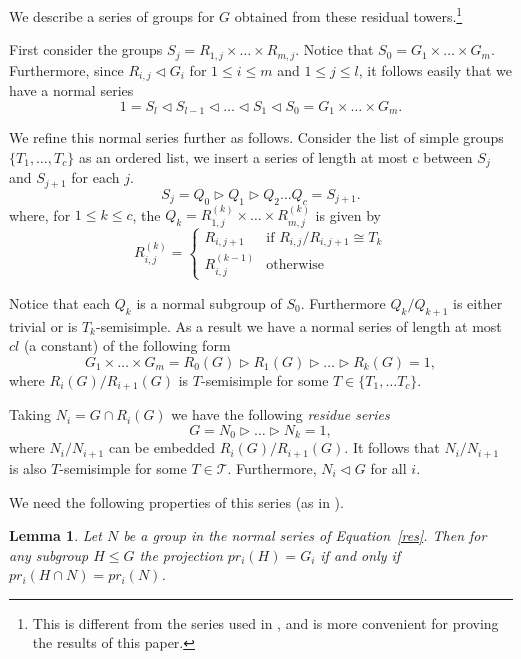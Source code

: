 \documentclass[11pt]{article}
\newtheorem{lemma}[theorem]{Lemma}
\newcommand{\pr}[2]{\ensuremath{pr_{#1}\left({#2}\right)}}
\begin{document}
We describe a series of groups for $G$ obtained from these residual
towers.\footnote{This is different from the series used in
\cite{luks}, and is more convenient for proving the results of this
paper.}

First consider the groups $S_j = R_{1,j} \times \ldots \times
R_{m,j}$.  Notice that $S_0 = G_1 \times \ldots \times G_m$.
Furthermore, since $R_{i,j} \lhd G_i$ for $1 \leq i \leq m$ and $1
\leq j \leq l$, it follows easily that we have a normal series
\[
1 = S_l \lhd S_{l-1} \lhd \ldots \lhd S_1 \lhd S_0 = G_1 \times \ldots
\times G_m.
\]

We refine this normal series further as follows. Consider the list of
simple groups $\{ T_1,\ldots, T_c\}$ as an ordered list, we insert a
series of length at most c between $S_j$ and $S_{j+1}$ for each $j$.
\[
S_j=Q_0 \rhd Q_1 \rhd Q_2 \ldots Q_c = S_{j+1}.
\]
where, for $1\leq k\leq c$, the $Q_k = R_{1,j}^{(k)} \times \ldots
\times R_{m,j}^{(k)}$ is given by
\[
R_{i,j}^{(k)} = \left\{ \begin{array}{cc}
    R_{i,j+1}& \textrm{if } R_{i,j}/R_{i,j+1} \cong T_k\\
    R^{(k-1)}_{i,j} & \textrm{otherwise}
    \end{array}
  \right.
\]

Notice that each $Q_k$ is a normal subgroup of $S_0$. Furthermore
$Q_k/Q_{k+1}$ is either trivial or is $T_k$-semisimple. As a result we
have a normal series of length at most $cl$ (a constant) of the
following form
\begin{equation}\label{restower}
G_1 \times \ldots \times G_m = R_0(G) \rhd R_1(G) \rhd \ldots \rhd
R_k(G) = 1,
\end{equation}
where $R_i(G)/R_{i+1}(G)$ is $T$-semisimple for some $T \in
\{T_1,\ldots T_c\}$.

Taking $N_i = G \cap R_i(G)$ we have the following \emph{residue
series}
\begin{equation}\label{res}
G = N_0 \rhd \ldots \rhd N_k = 1,
\end{equation} 
where $N_i/N_{i+1}$ can be embedded $R_i(G)/R_{i+1}(G)$. It
follows that $N_i/N_{i+1}$ is also $T$-semisimple for some $T \in
\mathcal{T}$. Furthermore, $N_i \lhd G$ for all $i$.

We need the following properties of this series (as in \cite{luks}).

\begin{lemma}{\rm\cite{luks}}\label{lem-N-soc}
  Let $N$ be a group in the normal series of
  Equation~\ref{res}. Then for any subgroup $H \leq G$
  the projection $\pr{i}{H} = G_i$ if and only if $\pr{i}{H \cap N} =
  \pr{i}{N}$.
\end{lemma}
\end{document}
